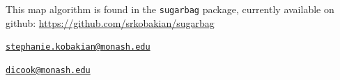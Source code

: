 This map algorithm is found in the \texttt{sugarbag} package, currently
available on github: \url{https://github.com/srkobakian/sugarbag}




\address{%
Stephanie Kobakian\\
Queensland Univeristy of Technology\\
\\
}
\href{mailto:stephanie.kobakian@monash.edu}{\nolinkurl{stephanie.kobakian@monash.edu}}

\address{%
Dianne Cook\\
Monash University\\
\\
}
\href{mailto:dicook@monash.edu}{\nolinkurl{dicook@monash.edu}}

